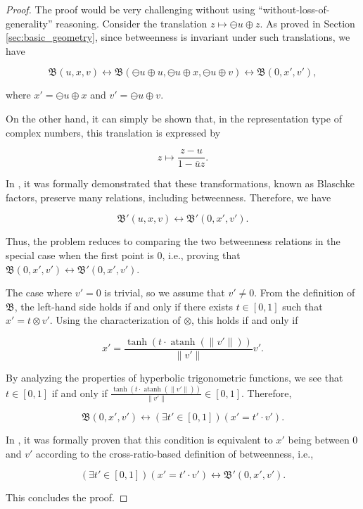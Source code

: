 \documentclass[a4paper]{article}
\DeclareMathOperator{\atanh}{atanh}
\theoremstyle{definition}
\begin{document}
\begin{proof}
The proof would be very challenging without using
``without-loss-of-generality'' reasoning. Consider the translation
$z \mapsto \ominus u \oplus z$. As proved in Section
\ref{sec:basic_geometry}, since betweenness is invariant under such
translations, we have

$$\mathfrak{B}(u, x, v) \longleftrightarrow \mathfrak{B}(\ominus u \oplus u, \ominus u \oplus x, \ominus u \oplus v) \longleftrightarrow \mathfrak{B}(0, x', v'),$$

\noindent where $x' = \ominus u \oplus x$ and
$v' = \ominus u \oplus v$.

On the other hand, it can simply be shown that, in the representation
type of complex numbers, this translation is expressed by

$$z \mapsto \frac{z - u}{1 - \overline{u}z}.$$

In \cite{amai-poincare}, it was formally demonstrated that these
transformations, known as Blaschke factors, preserve many relations,
including betweenness. Therefore, we have

$$\mathfrak{B}'(u, x, v) \longleftrightarrow \mathfrak{B}'(0, x', v').$$

Thus, the problem reduces to comparing the two betweenness relations
in the special case when the first point is 0, i.e., proving that
$\mathfrak{B}(0, x', v') \longleftrightarrow \mathfrak{B}'(0, x',
v')$.

The case where $v' = 0$ is trivial, so we assume that $v' \neq
0$. From the definition of $\mathfrak{B}$, the left-hand side holds if
and only if there exists $t \in [0, 1]$ such that $x' = t \otimes
v'$. Using the characterization of $\otimes$, this holds if and only
if

$$x' = \frac{\tanh(t \cdot \atanh (\lVert v' \rVert))}{\lVert v' \rVert} v'.$$

By analyzing the properties of hyperbolic trigonometric functions, we
see that $t \in [0, 1]$ if and only if
$\frac{\tanh(t \cdot \atanh (\lVert v' \rVert))}{\lVert v' \rVert} \in
[0, 1]$. Therefore,

$$\mathfrak{B}(0, x', v') \longleftrightarrow (\exists t' \in [0, 1])(x' = t' \cdot v').$$

In \cite{amai-poincare}, it was formally proven that this condition is
equivalent to $x'$ being between $0$ and $v'$ according to the
cross-ratio-based definition of betweenness, i.e.,

$$(\exists t' \in [0, 1])(x' = t' \cdot v') \longleftrightarrow \mathfrak{B}'(0, x', v').$$

This concludes the proof.
\end{proof}
\end{document}
